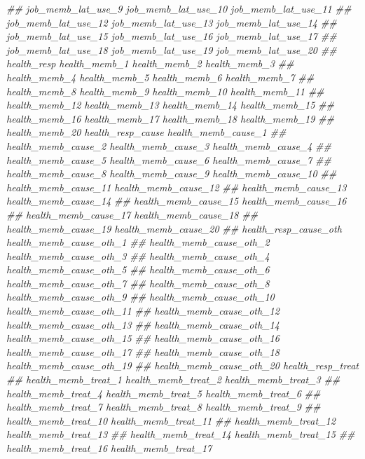 \documentclass[
]{article}
\newenvironment{Shaded}{\begin{snugshade}}{\end{snugshade}}
\newcommand{\CommentTok}[1]{\textcolor[rgb]{0.56,0.35,0.01}{\textit{#1}}}
\begin{document}
\begin{Shaded}
\begin{Highlighting}[]
\CommentTok{##      job_memb_lat_use_9 job_memb_lat_use_10 job_memb_lat_use_11}
\CommentTok{##      job_memb_lat_use_12 job_memb_lat_use_13 job_memb_lat_use_14}
\CommentTok{##      job_memb_lat_use_15 job_memb_lat_use_16 job_memb_lat_use_17}
\CommentTok{##      job_memb_lat_use_18 job_memb_lat_use_19 job_memb_lat_use_20}
\CommentTok{##      health_resp health_memb_1 health_memb_2 health_memb_3}
\CommentTok{##      health_memb_4 health_memb_5 health_memb_6 health_memb_7}
\CommentTok{##      health_memb_8 health_memb_9 health_memb_10 health_memb_11}
\CommentTok{##      health_memb_12 health_memb_13 health_memb_14 health_memb_15}
\CommentTok{##      health_memb_16 health_memb_17 health_memb_18 health_memb_19}
\CommentTok{##      health_memb_20 health_resp_cause health_memb_cause_1}
\CommentTok{##      health_memb_cause_2 health_memb_cause_3 health_memb_cause_4}
\CommentTok{##      health_memb_cause_5 health_memb_cause_6 health_memb_cause_7}
\CommentTok{##      health_memb_cause_8 health_memb_cause_9 health_memb_cause_10}
\CommentTok{##      health_memb_cause_11 health_memb_cause_12}
\CommentTok{##      health_memb_cause_13 health_memb_cause_14}
\CommentTok{##      health_memb_cause_15 health_memb_cause_16}
\CommentTok{##      health_memb_cause_17 health_memb_cause_18}
\CommentTok{##      health_memb_cause_19 health_memb_cause_20}
\CommentTok{##      health_resp_cause_oth health_memb_cause_oth_1}
\CommentTok{##      health_memb_cause_oth_2 health_memb_cause_oth_3}
\CommentTok{##      health_memb_cause_oth_4 health_memb_cause_oth_5}
\CommentTok{##      health_memb_cause_oth_6 health_memb_cause_oth_7}
\CommentTok{##      health_memb_cause_oth_8 health_memb_cause_oth_9}
\CommentTok{##      health_memb_cause_oth_10 health_memb_cause_oth_11}
\CommentTok{##      health_memb_cause_oth_12 health_memb_cause_oth_13}
\CommentTok{##      health_memb_cause_oth_14 health_memb_cause_oth_15}
\CommentTok{##      health_memb_cause_oth_16 health_memb_cause_oth_17}
\CommentTok{##      health_memb_cause_oth_18 health_memb_cause_oth_19}
\CommentTok{##      health_memb_cause_oth_20 health_resp_treat}
\CommentTok{##      health_memb_treat_1 health_memb_treat_2 health_memb_treat_3}
\CommentTok{##      health_memb_treat_4 health_memb_treat_5 health_memb_treat_6}
\CommentTok{##      health_memb_treat_7 health_memb_treat_8 health_memb_treat_9}
\CommentTok{##      health_memb_treat_10 health_memb_treat_11}
\CommentTok{##      health_memb_treat_12 health_memb_treat_13}
\CommentTok{##      health_memb_treat_14 health_memb_treat_15}
\CommentTok{##      health_memb_treat_16 health_memb_treat_17}

\end{Highlighting}
\end{Shaded}
\end{document}
